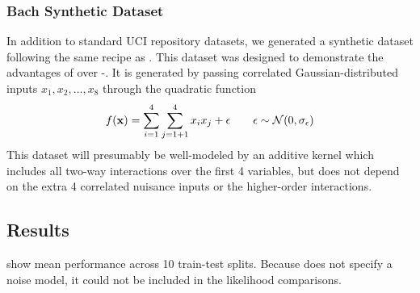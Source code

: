 \subsubsection{Bach Synthetic Dataset}
In addition to standard UCI repository datasets, we generated a synthetic dataset following the same recipe as \citet{DBLP:journals/corr/abs-0909-0844}.
This dataset was designed to demonstrate the advantages of \HKL{} over \gp{}-\SE{}.
It is generated by passing correlated Gaussian-distributed inputs $x_1, x_2, \dots, x_8$ through the quadratic function
%
\begin{align}
f({\bf{x}}) = \sum_{i=1}^4 \sum_{j=1+1}^4 x_i x_j + \epsilon \qquad \epsilon \sim \mathcal{N}\!\left(0,\sigma_\epsilon\right)
\end{align}
%
This dataset will presumably be well-modeled by an additive kernel which includes all two-way interactions over the first 4 variables, but does not depend on the extra 4 correlated nuisance inputs or the higher-order interactions.%

 
 
\subsection{Results}
 show mean performance across 10 train-test splits.
Because \HKL{} does not specify a noise model, it could not be included in the likelihood comparisons.

